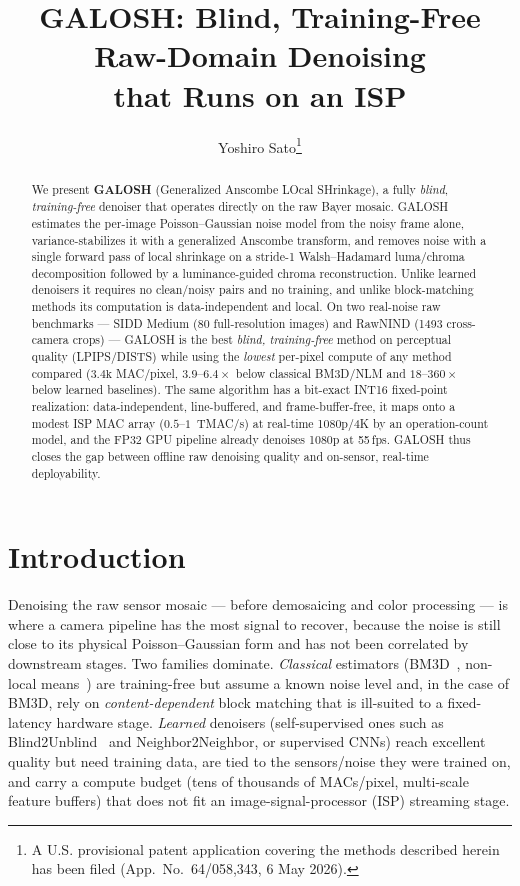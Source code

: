 \documentclass[10pt,twocolumn]{article}
\title{\textbf{GALOSH: Blind, Training-Free Raw-Domain Denoising\\
that Runs on an ISP}}
\author{Yoshiro Sato\thanks{A U.S. provisional patent application covering the
methods described herein has been filed (App.\ No.\ 64/058,343, 6 May 2026).}}
\date{}
\begin{document}
\maketitle

\begin{abstract}
We present \textbf{GALOSH} (Generalized Anscombe LOcal SHrinkage), a fully
\emph{blind}, \emph{training-free} denoiser that operates directly on the raw
Bayer mosaic. GALOSH estimates the per-image Poisson--Gaussian noise model from
the noisy frame alone, variance-stabilizes it with a generalized Anscombe
transform, and removes noise with a single forward pass of local shrinkage on a
stride-1 Walsh--Hadamard luma/chroma decomposition followed by a luminance-guided
chroma reconstruction. Unlike learned denoisers it requires no clean/noisy pairs
and no training, and unlike block-matching methods its computation is
data-independent and local. On two real-noise raw benchmarks --- SIDD Medium
(80 full-resolution images) and RawNIND (1493 cross-camera crops) --- GALOSH is
the best \emph{blind, training-free} method on perceptual quality (LPIPS/DISTS)
while using the \emph{lowest} per-pixel compute of any method compared
($3.4\text{k}$ MAC/pixel, $3.9$--$6.4\times$ below classical BM3D/NLM and
$18$--$360\times$ below learned baselines). The same algorithm has a bit-exact
INT16 fixed-point realization: data-independent, line-buffered, and
frame-buffer-free, it maps onto a modest ISP MAC array
($0.5$--$1$~TMAC/s) at real-time 1080p/4K by an operation-count model, and the
FP32 GPU pipeline already denoises 1080p at 55\,fps. GALOSH thus closes the gap
between offline raw denoising quality and on-sensor, real-time deployability.
\end{abstract}

\section{Introduction}
Denoising the raw sensor mosaic --- before demosaicing and color processing ---
is where a camera pipeline has the most signal to recover, because the noise is
still close to its physical Poisson--Gaussian form and has not been correlated by
downstream stages. Two families dominate. \emph{Classical} estimators
(BM3D~\cite{bm3d}, non-local means~\cite{nlm}) are training-free but assume a
known noise level and, in the case of BM3D, rely on \emph{content-dependent}
block matching that is ill-suited to a fixed-latency hardware stage. \emph{Learned}
denoisers (self-supervised ones such as Blind2Unblind~\cite{b2u} and
Neighbor2Neighbor, or supervised CNNs) reach excellent quality but need training
data, are tied to the sensors/noise they were trained on, and carry a compute
budget (tens of thousands of MACs/pixel, multi-scale feature buffers) that does
not fit an image-signal-processor (ISP) streaming stage.
\end{document}
